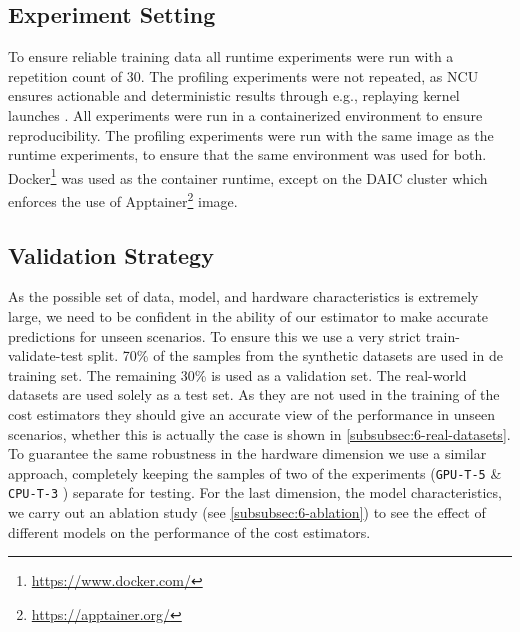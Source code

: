 \subsection{Experiment Setting}
To ensure reliable training data all runtime experiments were run with a repetition count of $30$. The profiling experiments were not repeated, as NCU ensures actionable and deterministic results through e.g., replaying kernel launches \cite{nsight_compute}. All experiments were run in a containerized environment to ensure reproducibility. The profiling experiments were run with the same image as the runtime experiments, to ensure that the same environment was used for both. Docker\footnote{\url{https://www.docker.com/}} was used as the container runtime, except on the DAIC cluster which enforces the use of Apptainer\footnote{\url{https://apptainer.org/}} image.

\subsection{Validation Strategy}
\label{subsec:6-validation-strategy}

As the possible set of data, model, and hardware characteristics is extremely large, we need to be confident in the ability of our estimator to make accurate predictions for unseen scenarios. To ensure this we use a very strict train-validate-test split. 70\% of the samples from the synthetic datasets are used in de training set. The remaining 30\% is used as a validation set. The real-world datasets are used solely as a test set. As they are not used in the training of the cost estimators they should give an accurate view of the performance in unseen scenarios, whether this is actually the case is shown in \autoref{subsubsec:6-real-datasets}. To guarantee the same robustness in the hardware dimension we use a similar approach, completely keeping the samples of two of the experiments (\texttt{GPU-T-5} \& \texttt{CPU-T-3} ) separate for testing. For the last dimension, the model characteristics, we carry out an ablation study (see \autoref{subsubsec:6-ablation}) to see the effect of different models on the performance of the cost estimators.




